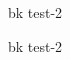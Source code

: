 \documentclass{book}
\begin{document}
\colorbox{mg}{bk test-2}

\newpage
\colorbox{mg}{bk test-2}
\end{document}
